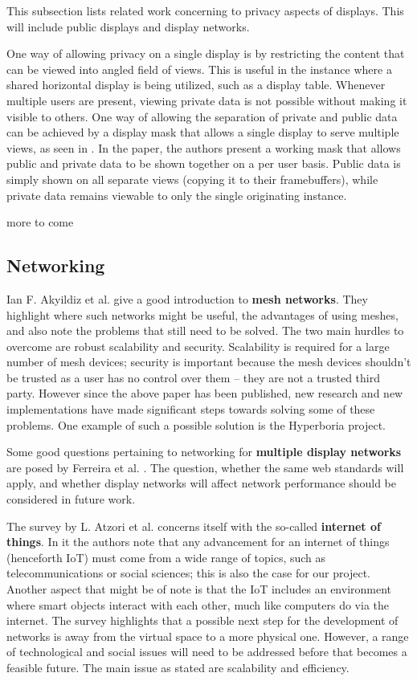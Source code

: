 This subsection lists related work concerning to privacy aspects of displays.
This will include public displays and display networks.

One way of allowing privacy on a single display is by restricting the content that can be viewed into angled field of views.
This is useful in the instance where a shared horizontal display is being utilized, such as a display table.
Whenever multiple users are present, viewing private data is not possible without making it visible to others.
One way of allowing the separation of private and public data can be achieved by a display mask that allows a single display to serve multiple views, as seen in \cite{smith2008public}.
In the paper, the authors present a working mask that allows public and private data to be shown together on a per user basis.
Public data is simply shown on all separate views (copying it to their framebuffers), while private data remains viewable to only the single originating instance.

more to come

\subsection{Networking}

Ian F. Akyildiz et al. \cite{akyildiz2005survey} give a good introduction to \textbf{mesh networks}.
They highlight where such networks might be useful, the advantages of using meshes, and also note the problems that still need to be solved.
The two main hurdles to overcome are robust scalability and security.
Scalability is required for a large number of mesh devices; security is important because the mesh devices shouldn't be trusted as a user has no control over them – they are not a trusted third party.
However since the above paper has been published, new research and new implementations have made significant steps towards solving some of these problems.
One example of such a possible solution is the Hyperboria \cite{hyperboria} project.

Some good questions pertaining to networking for \textbf{multiple display networks} are posed by Ferreira et al. \cite{ferreira2012scalability}.
The question, whether the same web standards will apply, and whether display networks will affect network performance should be considered in future work.

The survey by L. Atzori et al. \cite{atzori2010internet} concerns itself with the so-called \textbf{internet of things}.
In it the authors note that any advancement for an internet of things (henceforth IoT) must come from a wide range of topics, such as telecommunications or social sciences; this is also the case for our project.
Another aspect that might be of note is that the IoT includes an environment where smart objects interact with each other, much like computers do via the internet.
The survey highlights that a possible next step for the development of networks is away from the virtual space to a more physical one.
However, a range of technological and social issues will need to be addressed before that becomes a feasible future.
The main issue as stated are scalability and efficiency.
